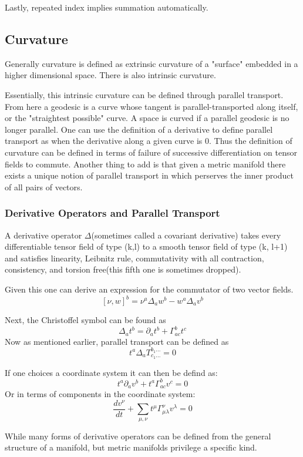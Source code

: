 Lastly, repeated index implies summation automatically.

\subsection{Curvature}
Generally curvature is defined as extrinsic curvature of a "surface" embedded in a higher dimensional space. There is also intrinsic curvature.

Essentially, this intrinsic curvature can be defined through parallel transport. From here a geodesic is a curve whose tangent is parallel-transported along itself, or the "straightest possible" curve. A space is curved if a parallel geodesic is no longer parallel. One can use the definition of a derivative to define parallel transport as when the derivative along a given curve is 0. Thus the definition of curvature can be defined in terms of failure of successive differentiation on tensor fields to commute. Another thing to add is that given a metric manifold there exists a unique notion of parallel transport in which perserves the inner product of all pairs of vectors.

\subsubsection{Derivative Operators and Parallel Transport}

A derivative operator $\Delta$(sometimes called a covariant derivative) takes every differentiable tensor field of type (k,l) to a smooth tensor field of type (k, l+1) and satisfies linearity, Leibnitz rule, commutativity with all contraction, consistency, and torsion free(this fifth one is sometimes dropped).

Given this one can derive an expression for the commutator of two vector fields.
\[
    [\nu, w]^b = \nu^a \Delta_a w^b - w^a \Delta_a v^b
  \]

  Next, the Christoffel symbol can be found as
\[
\Delta_a t^b = \partial_a t^b + \Gamma^b_{ac}t^c
  \]
  Now as mentioned earlier, parallel transport can be defined as
\[
t^a \Delta_a T^{b_1...}_{c_1...}=0
  \]

  If one choices a coordinate system it can then be defind as:
\[
t^a \partial_a v^b + t^a \Gamma^b_{ac}v^c = 0
  \]
  Or in terms of components in the coordinate system:
\[
\frac{dv^\nu}{dt} + \sum_{\mu , \nu} t^\mu \Gamma^\nu_{\mu \lambda}v^\lambda = 0
  \]

  While many forms of derivative operators can be defined from the general structure of a manifold, but metric manifolds privilege a specific kind.

